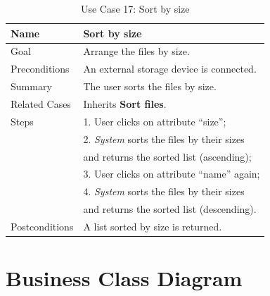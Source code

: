 \clearpage

\begin{table}[t]
\centering
\begin{tabular}{|l|l|}
\hline
Name & Sort by size\\ \hline
Goal & Arrange the files by size.\\ \hline
Preconditions & An external storage device is connected. \\ \hline
Summary & The user sorts the files by size.\\ \hline
Related Cases & Inherits \textbf{Sort files}. \\ \hline
Steps &  1. User clicks on attribute ``size''; \\
      &  2. \textit{System} sorts the files by their sizes
      \\ & and returns the sorted list (ascending); \\
      &  3. User clicks on attribute ``name'' again; \\
      &  4. \textit{System} sorts the files by their sizes
      \\ & and returns the sorted list (descending).
        \\ \hline
Postconditions & A list sorted by size is returned.
\\ \hline
\end{tabular}
\caption{Use Case 17: Sort by size}
\label{tab:UC17}
\end{table}

\clearpage

\section{Business Class Diagram}

